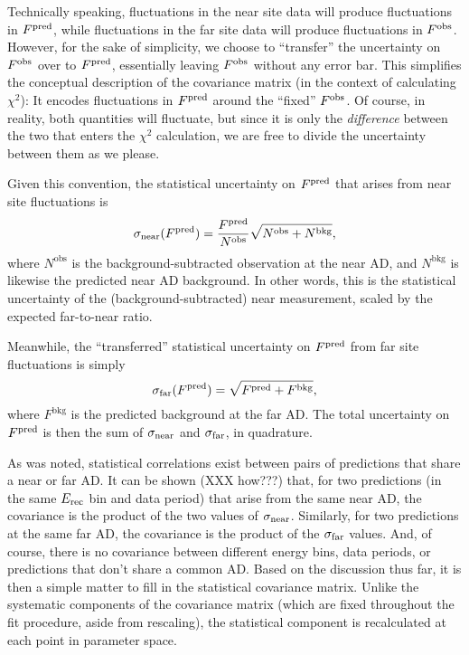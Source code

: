 \documentclass[../thesis.tex]{subfiles}
\begin{document}
Technically speaking, fluctuations in the near site data will produce fluctuations in $F^{\mathrm{pred}}$, while fluctuations in the far site data will produce fluctuations in $F^{\mathrm{obs}}$. However, for the sake of simplicity, we choose to ``transfer'' the uncertainty on $F^{\mathrm{obs}}$ over to $F^{\mathrm{pred}}$, essentially leaving $F^{\mathrm{obs}}$ without any error bar. This simplifies the conceptual description of the covariance matrix (in the context of calculating $\chi^2$): It encodes fluctuations in $F^{\mathrm{pred}}$ around the ``fixed'' $F^{\mathrm{obs}}$. Of course, in reality, both quantities will fluctuate, but since it is only the \emph{difference} between the two that enters the $\chi^2$ calculation, we are free to divide the uncertainty between them as we please.

Given this convention, the statistical uncertainty on $F^{\mathrm{pred}}$ that arises from near site fluctuations is
\begin{equation*}
  \sigma_{\mathrm{near}}(F^{\mathrm{pred}}) = \frac{F^{\mathrm{pred}}}{N^{\mathrm{obs}}} \sqrt{N^{\mathrm{obs}} + N^{\mathrm{bkg}}},
\end{equation*}
where $N^{\mathrm{obs}}$ is the background-subtracted observation at the near AD, and $N^{\mathrm{bkg}}$ is likewise the predicted near AD background. In other words, this is the statistical uncertainty of the (background-subtracted) near measurement, scaled by the expected far-to-near ratio.

Meanwhile, the ``transferred'' statistical uncertainty on $F^{\mathrm{pred}}$ from far site fluctuations is simply
\begin{equation*}
  \sigma_{\mathrm{far}}(F^{\mathrm{pred}}) = \sqrt{F^{\mathrm{pred}} + F^{\mathrm{bkg}}},
\end{equation*}
where $F^{\mathrm{bkg}}$ is the predicted background at the far AD. The total uncertainty on $F^{\mathrm{pred}}$ is then the sum of $\sigma_{\mathrm{near}}$ and $\sigma_{\mathrm{far}}$, in quadrature.

As was noted, statistical correlations exist between pairs of predictions that share a near or far AD. It can be shown (XXX how???) that, for two predictions (in the same $E_\mathrm{rec}$ bin and data period) that arise from the same near AD, the covariance is the product of the two values of $\sigma_{\mathrm{near}}$. Similarly, for two predictions at the same far AD, the covariance is the product of the $\sigma_{\mathrm{far}}$ values. And, of course, there is no covariance between different energy bins, data periods, or predictions that don't share a common AD. Based on the discussion thus far, it is then a simple matter to fill in the statistical covariance matrix. Unlike the systematic components of the covariance matrix (which are fixed throughout the fit procedure, aside from rescaling), the statistical component is recalculated at each point in parameter space.
\end{document}
